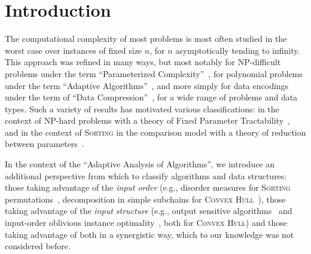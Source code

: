 \section{Introduction}
\label{sec:intro}


The computational complexity of most problems is most often studied in
the worst case over instances of fixed size $n$, for $n$
asymptotically tending to infinity. This approach was refined in many
ways, but most notably for NP-difficult problems under the term
``Parameterized
Complexity''~\cite{2006-BOOK-ParameterizedComplexityTheory-FlumGrohe},
for polynomial problems under the term ``Adaptive
Algorithms''~\cite{1992-ACMCS-ASurveyOfAdaptiveSortingAlgorithms-EstivillCastroWood,1992-ACJ-AnOverviewOfAdaptiveSorting-MoffatPetersson},
and more simply for data encodings under the term of ``Data
Compression''~\cite{2013-TCS-OnCompressingPermutationsAndAdaptiveSorting-BarbayNavarro},
for a wide range of problems and data types.  Such a variety of
results has motivated various classifications: in the context of
NP-hard problems with a theory of Fixed Parameter
Tractability~\cite{2006-BOOK-ParameterizedComplexityTheory-FlumGrohe},
and in the context of \textsc{Sorting} in the comparison model with a
theory of reduction between
parameters~\cite{1995-DAM-AFrameworkForAdaptiveSorting-PeterssonMoffat}.


In the context of the ``Adaptive Analysis of Algorithms'', we
introduce an additional perspective from which to classify algorithms
and data structures: those taking advantage of the \emph{input order}
(e.g., disorder measures for \textsc{Sorting}
permutations~\cite{1992-ACJ-AnOverviewOfAdaptiveSorting-MoffatPetersson,1992-ACMCS-ASurveyOfAdaptiveSortingAlgorithms-EstivillCastroWood},
decomposition in simple subchains for \textsc{Convex
  Hull}~\cite{2002-SWAT-AdaptiveAlgorithmsForConstructingConvexHullsAndTriangulationsOfPolygonalChains-LevcopoulosLingasMitchell}),
those taking advantage of the \emph{input structure} (e.g., output
sensitive
algorithms~\cite{1986-JCom-TheUltimatePlanarConvexHullAlgorithm-KirkpatrickSeidel}
and input-order oblivious instance
optimality~\cite{2009-FOCS-InstanceOptimalGeometricAlgorithms-AfshaniBarbayChan},
both for \textsc{Convex Hull}) and those taking advantage of both in a
synergistic way, which to our knowledge was not considered before.

